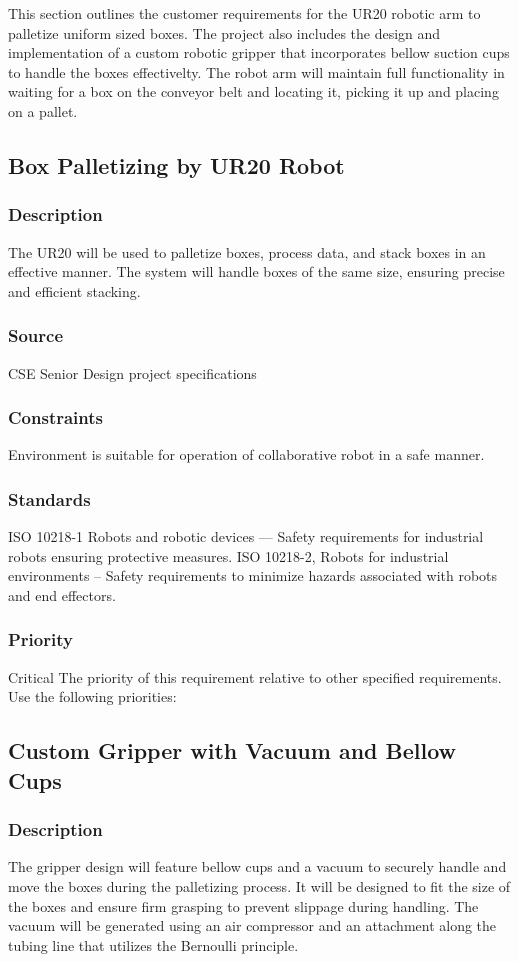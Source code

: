 This section outlines the customer requirements for the UR20 robotic arm to palletize uniform sized boxes. The project also includes the design and implementation of a custom robotic gripper that incorporates bellow suction cups to handle the boxes effectivelty. The robot arm will maintain full functionality in waiting for a box on the conveyor belt and locating it, picking it up and placing on a pallet. 
\subsection{Box Palletizing by UR20 Robot}
\subsubsection{Description}
The UR20 will be used to palletize boxes, process data, and stack boxes in an effective manner. The system will handle boxes of the same size, ensuring precise and efficient stacking.
\subsubsection{Source}
 CSE Senior Design project specifications
\subsubsection{Constraints}
Environment is suitable for operation of collaborative robot in a safe manner. 
\subsubsection{Standards}
ISO 10218-1 Robots and robotic devices — Safety requirements for industrial robots ensuring protective measures.
ISO 10218-2, Robots for industrial environments – Safety requirements to minimize hazards associated with robots and end effectors.
\subsubsection{Priority}
Critical
The priority of this requirement relative to other specified requirements. Use the following priorities:

\subsection{Custom Gripper with Vacuum and Bellow Cups}
\subsubsection{Description}
The gripper design will feature bellow cups and a vacuum to securely handle and move the boxes during the palletizing process. It will be designed to fit the size of the boxes and ensure firm grasping to prevent slippage during handling. The vacuum will be generated using an air compressor and an attachment along the tubing line that utilizes the Bernoulli principle.
